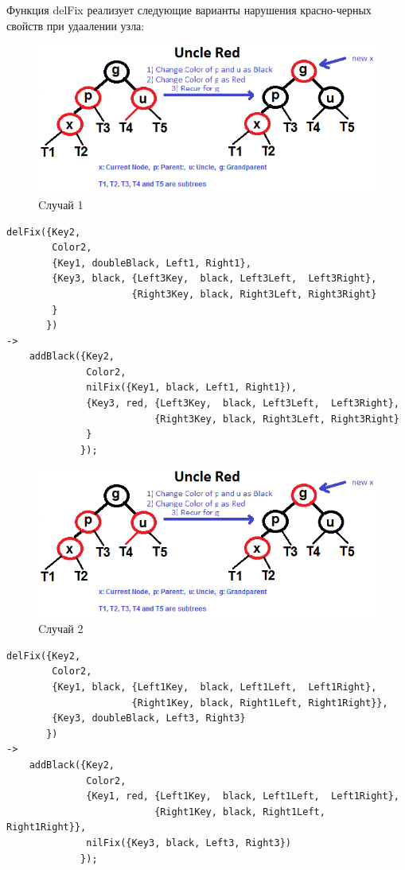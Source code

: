 			Функция delFix реализует следующие варианты нарушения красно-черных свойств 
			при удаалении узла:
			\begin{figure}[H]
				\centering
				\includegraphics[width=\textwidth]{img/tan-aus.png}
				\caption{Cлучай 1}
			\end{figure}
			\begin{lstlisting}
delFix({Key2, 														   				
	    Color2, 													   				
	    {Key1, doubleBlack, Left1, Right1}, 						   				
	    {Key3, black, {Left3Key,  black, Left3Left,  Left3Right}, 	   				
	                  {Right3Key, black, Right3Left, Right3Right}	   				
	    }															   				
	   })															   				
->																	   				
	addBlack({Key2, 												   				
	          Color2, 												   				
	          nilFix({Key1, black, Left1, Right1}), 				   				
	          {Key3, red, {Left3Key,  black, Left3Left,  Left3Right},  				
	                      {Right3Key, black, Right3Left, Right3Right}  				
	          }     												   				
	         });				
			\end{lstlisting}
			
			\begin{figure}[H]
				\centering
				\includegraphics[width=\textwidth]{img/tan-aus.png}
				\caption{Cлучай 2}
			\end{figure}
			\begin{lstlisting}
delFix({Key2, 														   				
	    Color2, 													   				
	    {Key1, black, {Left1Key,  black, Left1Left,  Left1Right}, 	   				
	                  {Right1Key, black, Right1Left, Right1Right}},    				
	    {Key3, doubleBlack, Left3, Right3}							   				
	   }) 															   				
->																	   				
	addBlack({Key2, 												   				
	          Color2, 												   				
	          {Key1, red, {Left1Key,  black, Left1Left,  Left1Right},  				
	                      {Right1Key, black, Right1Left, Right1Right}},				
	          nilFix({Key3, black, Left3, Right3})					   				
	         });													   				
			\end{lstlisting}
			
